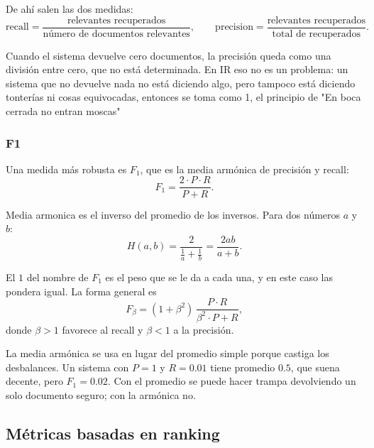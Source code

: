 \documentclass[11pt,letterpaper]{article}
\begin{document}
De ahí salen las dos medidas:
\[
    \mathrm{recall} =
    \frac{\text{relevantes recuperados}}
         {\text{número de documentos relevantes}} ,
    \qquad
    \mathrm{precision} =
    \frac{\text{relevantes recuperados}}
         {\text{total de recuperados}} .
\]

\begin{ojo}
    Cuando el sistema devuelve cero documentos, la precisión queda
    como una división entre cero, que no está determinada. En IR eso
    no es un problema: un sistema que no devuelve nada no está
    diciendo algo, pero tampoco está diciendo tonterías ni cosas
    equivocadas, entonces se toma como 1, el principio de "En boca cerrada no entran
    moscas"
\end{ojo}

\subsubsection*{F1}

Una medida más robusta es $F_1$, que es la media armónica de precisión y
recall:
\[
    F_1 = \frac{2 \cdot P \cdot R}{P + R} .
\]

\begin{idea}
    Media armonica es el inverso del promedio de los inversos. Para dos números $a$ y $b$:
\[
    H(a,b) = \frac{2}{\frac{1}{a} + \frac{1}{b}} = \frac{2ab}{a+b}.
\]
\end{idea}

El $1$ del nombre de $F_1$ es el peso que se le da a cada una, y en este caso
las pondera igual. La forma general es
\[
    F_\beta = (1 + \beta^2)\,
    \frac{P \cdot R}{\beta^2 \cdot P + R} ,
\]
donde $\beta > 1$ favorece al recall y $\beta < 1$ a la precisión.

\begin{idea}
    La media armónica se usa en lugar del promedio simple porque
    castiga los desbalances. Un sistema con $P = 1$ y $R = 0.01$ tiene
    promedio $0.5$, que suena decente, pero $F_1 = 0.02$. Con el
    promedio se puede hacer trampa devolviendo un solo documento
    seguro; con la armónica no.
\end{idea}


\subsection*{Métricas basadas en ranking}
\end{document}
